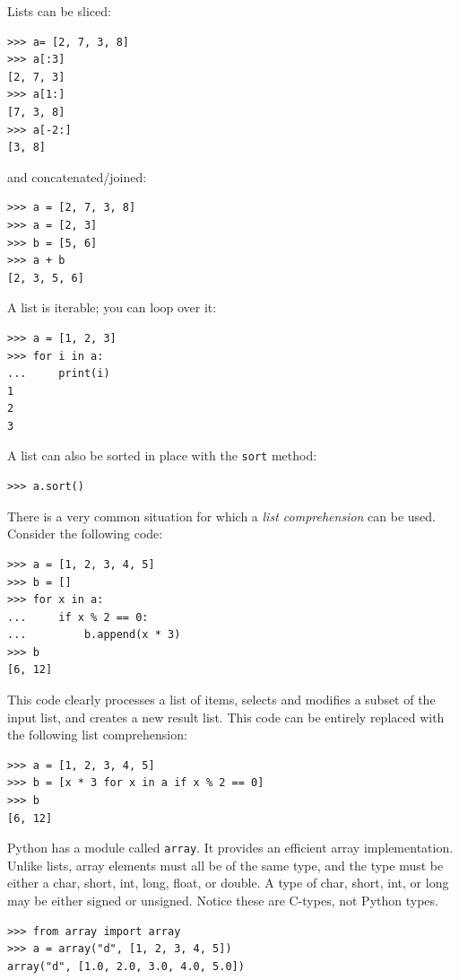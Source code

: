 \documentclass[justified, sixbynine]{tufte-book}
\def\ft{\small\tt}
\theoremstyle{plain}%
\newtheorem * {corollary}{Corollary}
\theoremstyle{definition}
\theoremstyle{remark}
\newtheorem * {remark}{Remark}
\newtheorem * {note}{Note}
\begin{document}
\begin{fullwidth}
Lists can be sliced:

\begin{lstlisting}
>>> a= [2, 7, 3, 8]
>>> a[:3]
[2, 7, 3]
>>> a[1:]
[7, 3, 8]
>>> a[-2:]
[3, 8]
\end{lstlisting}
\noindent and concatenated/joined:

\begin{lstlisting}
>>> a = [2, 7, 3, 8]
>>> a = [2, 3]
>>> b = [5, 6]
>>> a + b
[2, 3, 5, 6]
\end{lstlisting}

A list is iterable; you can loop over it:

\begin{lstlisting}
>>> a = [1, 2, 3]
>>> for i in a:
...     print(i)
1
2
3
\end{lstlisting}

A list can also be sorted in place with the {\ft sort} method:

\begin{lstlisting}
>>> a.sort()
\end{lstlisting}


There is a very common situation for which a {\it list comprehension} can be used. Consider the following code:

\begin{lstlisting}
>>> a = [1, 2, 3, 4, 5]
>>> b = []
>>> for x in a:
...     if x % 2 == 0:
...         b.append(x * 3)
>>> b
[6, 12]
\end{lstlisting}

This code clearly processes a list of items, selects and modifies a subset of the input list, and creates a new result list. This code can be entirely replaced with the following list comprehension:

\begin{lstlisting}
>>> a = [1, 2, 3, 4, 5]
>>> b = [x * 3 for x in a if x % 2 == 0]
>>> b
[6, 12]
\end{lstlisting}

Python has a module called {\ft array}. It provides an efficient array implementation. Unlike lists, array elements must all be of the same type, and the type must be either a char, short, int, long, float, or double.  A type of char, short, int, or long may be either signed or unsigned. Notice these are C-types, not Python types.

\begin{lstlisting}
>>> from array import array
>>> a = array("d", [1, 2, 3, 4, 5])
array("d", [1.0, 2.0, 3.0, 4.0, 5.0])
\end{lstlisting}


\end{fullwidth}
\end{document}
